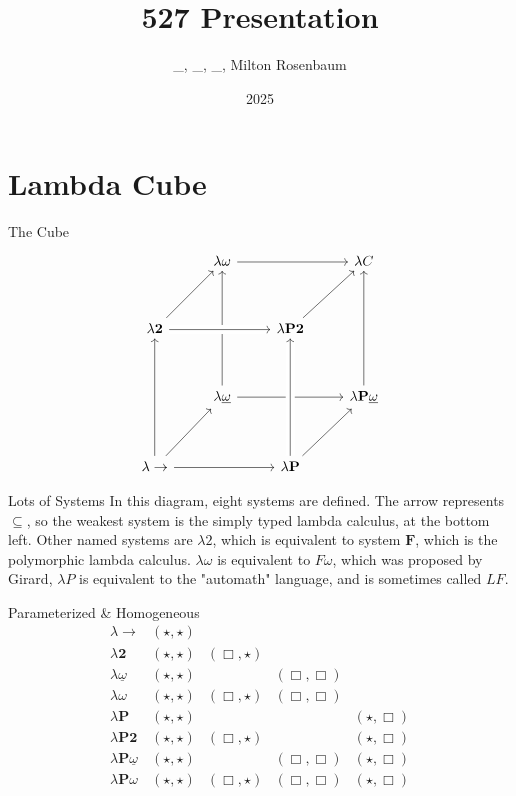 \documentclass{beamer}
\title{527 Presentation}
\author{\_, \_, \_, Milton Rosenbaum}
\institute{Comp 527}
\date{2025}
\begin{document}
\frame{\titlepage}

\section{Lambda Cube}

\begin{frame}{The Cube}
\[\begin{tikzcd}[ampersand replacement=\&, row sep=3.4em]
    \& \lambda\omega \arrow[rr] \arrow[from=dd] \&\& \lambda C \\
    \lambda \textbf{2} \arrow[ur] \arrow[rr, crossing over] \&\& \lambda \textbf{P2} \arrow[ur] \& \\
	\& \lambda\underline{\omega} \arrow[rr] \&\& \lambda \textbf{P} \underline{\omega} \arrow[uu] \\
	\lambda\rightarrow \arrow[uu] \arrow[rr] \arrow[ur] \&\& \lambda \textbf{P} \arrow[ur] \arrow[uu, crossing over]
\end{tikzcd}\]
\end{frame}

\begin{frame}{Lots of Systems}
    In this diagram, eight systems are defined. The arrow represents $\subseteq$, so the weakest system is the simply typed lambda calculus, at the bottom left. Other named systems are $\lambda 2$, which is equivalent to system $\textbf{F}$, which is the polymorphic lambda calculus. $\lambda\omega$ is equivalent to $F\omega$, which was proposed by Girard, $\lambda P$ is equivalent to the "automath" language, and is sometimes called $LF$.
\end{frame}

\begin{frame}{Parameterized \& Homogeneous}
    \[
    \begin{array}{l|cccc}
\lambda\rightarrow & (\star, \star)\\
\lambda \textbf{2} & (\star, \star) & (\Box, \star) \\
\lambda \underline\omega & (\star, \star) && (\Box, \Box) \\
\lambda \omega& (\star, \star) & (\Box, \star) & (\Box, \Box) \\
\lambda\textbf{P} & (\star, \star) &&& (\star, \Box)\\
\lambda \textbf{P2} & (\star, \star) & (\Box, \star)&& (\star, \Box) \\
\lambda \textbf{P}\underline\omega & (\star, \star) && (\Box, \Box)& (\star, \Box) \\
\lambda \textbf{P}\omega& (\star, \star) & (\Box, \star) & (\Box, \Box)&(\star, \Box) \\

\end{array}
    \]
\end{frame}
\end{document}
